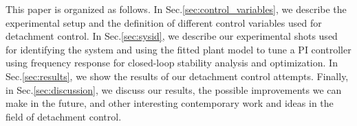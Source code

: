 This paper is organized as follows.
In Sec.\ref{sec:control_variables}, we describe the experimental setup and the definition of different control variables used for detachment control.
In Sec.\ref{sec:sysid}, we describe our experimental shots used for identifying the system and using the fitted plant model to tune a PI controller using frequency response for closed-loop stability analysis and optimization.
In Sec.\ref{sec:results}, we show the results of our detachment control attempts.
Finally, in Sec.\ref{sec:discussion}, we discuss our results, the possible improvements we can make in the future, and other interesting contemporary work and ideas in the field of detachment control.